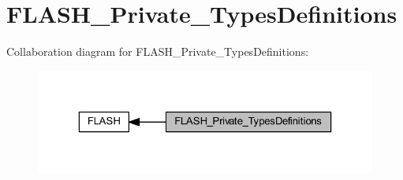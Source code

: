 \hypertarget{group___f_l_a_s_h___private___types_definitions}{}\section{F\+L\+A\+S\+H\+\_\+\+Private\+\_\+\+Types\+Definitions}
\label{group___f_l_a_s_h___private___types_definitions}
Collaboration diagram for F\+L\+A\+S\+H\+\_\+\+Private\+\_\+\+Types\+Definitions\+:
\nopagebreak
\begin{figure}[H]
\begin{center}
\leavevmode
\includegraphics[width=323pt]{group___f_l_a_s_h___private___types_definitions}
\end{center}
\end{figure}

